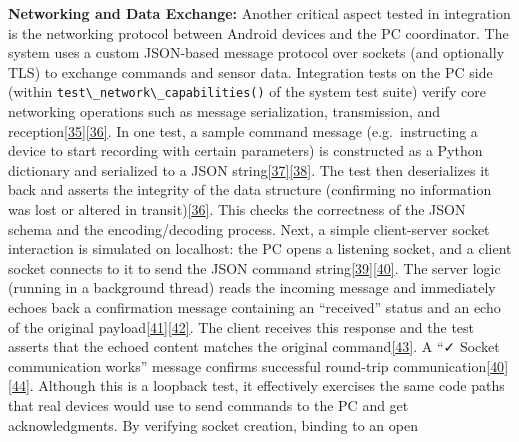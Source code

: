\documentclass[12pt,a4paper]{article}
\begin{document}
\textbf{Networking and Data Exchange:} Another critical aspect tested in integration is the networking protocol between Android devices and the PC coordinator. The system uses a custom JSON-based message protocol over sockets (and optionally TLS) to exchange commands and sensor data. Integration tests on the PC side (within \passthrough{\lstinline!test\_network\_capabilities()!} of the system test suite) verify core networking operations such as message serialization, transmission, and reception\href{https://github.com/buccancs/bucika_gsr/blob/7048f7f6a7536f5cd577ed2184800d3dad97fd08/PythonApp/system_test.py\#L151-L159}{{[}35{]}}\href{https://github.com/buccancs/bucika_gsr/blob/7048f7f6a7536f5cd577ed2184800d3dad97fd08/PythonApp/system_test.py\#L163-L171}{{[}36{]}}. In one test, a sample command message (e.g.~instructing a device to start recording with certain parameters) is constructed as a Python dictionary and serialized to a JSON string\href{https://github.com/buccancs/bucika_gsr/blob/7048f7f6a7536f5cd577ed2184800d3dad97fd08/PythonApp/system_test.py\#L151-L160}{{[}37{]}}\href{https://github.com/buccancs/bucika_gsr/blob/7048f7f6a7536f5cd577ed2184800d3dad97fd08/PythonApp/system_test.py\#L161-L169}{{[}38{]}}. The test then deserializes it back and asserts the integrity of the data structure (confirming no information was lost or altered in transit)\href{https://github.com/buccancs/bucika_gsr/blob/7048f7f6a7536f5cd577ed2184800d3dad97fd08/PythonApp/system_test.py\#L163-L171}{{[}36{]}}. This checks the correctness of the JSON schema and the encoding/decoding process. Next, a simple client-server socket interaction is simulated on localhost: the PC opens a listening socket, and a client socket connects to it to send the JSON command string\href{https://github.com/buccancs/bucika_gsr/blob/7048f7f6a7536f5cd577ed2184800d3dad97fd08/PythonApp/system_test.py\#L170-L178}{{[}39{]}}\href{https://github.com/buccancs/bucika_gsr/blob/7048f7f6a7536f5cd577ed2184800d3dad97fd08/PythonApp/system_test.py\#L174-L182}{{[}40{]}}. The server logic (running in a background thread) reads the incoming message and immediately echoes back a confirmation message containing an ``received'' status and an echo of the original payload\href{https://github.com/buccancs/bucika_gsr/blob/7048f7f6a7536f5cd577ed2184800d3dad97fd08/PythonApp/system_test.py\#L175-L183}{{[}41{]}}\href{https://github.com/buccancs/bucika_gsr/blob/7048f7f6a7536f5cd577ed2184800d3dad97fd08/PythonApp/system_test.py\#L179-L187}{{[}42{]}}. The client receives this response and the test asserts that the echoed content matches the original command\href{https://github.com/buccancs/bucika_gsr/blob/7048f7f6a7536f5cd577ed2184800d3dad97fd08/PythonApp/system_test.py\#L190-L198}{{[}43{]}}. A ``✓ Socket communication works'' message confirms successful round-trip communication\href{https://github.com/buccancs/bucika_gsr/blob/7048f7f6a7536f5cd577ed2184800d3dad97fd08/PythonApp/system_test.py\#L174-L182}{{[}40{]}}\href{https://github.com/buccancs/bucika_gsr/blob/7048f7f6a7536f5cd577ed2184800d3dad97fd08/PythonApp/system_test.py\#L189-L197}{{[}44{]}}. Although this is a loopback test, it effectively exercises the same code paths that real devices would use to send commands to the PC and get acknowledgments. By verifying socket creation, binding to an open 
\end{document}
